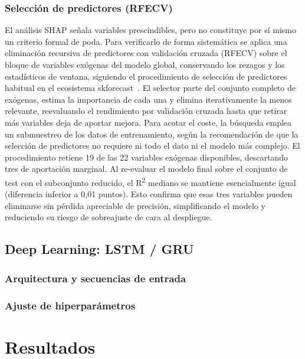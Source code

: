 \documentclass[12pt, a4paper]{article}
\begin{document}
\subsubsection{Selección de predictores (RFECV)}


El análisis SHAP señala variables prescindibles, pero no constituye por sí mismo un criterio formal de poda. Para verificarlo de forma sistemática se aplica una eliminación recursiva de predictores con validación cruzada (RFECV) sobre el bloque de variables exógenas del modelo global, conservando los rezagos y los estadísticos de ventana, siguiendo el procedimiento de selección de predictores habitual en el ecosistema skforecast~\cite{skforecast}. El selector parte del conjunto completo de exógenas, estima la importancia de cada una y elimina iterativamente la menos relevante, reevaluando el rendimiento por validación cruzada hasta que retirar más variables deja de aportar mejora. Para acotar el coste, la búsqueda emplea un submuestreo de los datos de entrenamiento, según la recomendación de que la selección de predictores no requiere ni todo el dato ni el modelo más complejo. El procedimiento retiene 19 de las 22 variables exógenas disponibles, descartando tres de aportación marginal. Al re-evaluar el modelo final sobre el conjunto de test con el subconjunto reducido, el R\textsuperscript{2} mediano se mantiene esencialmente igual (diferencia inferior a 0,01 puntos). Esto confirma que esas tres variables pueden eliminarse sin pérdida apreciable de precisión, simplificando el modelo y reduciendo su riesgo de sobreajuste de cara al despliegue.

\subsection{Deep Learning: LSTM / GRU}


\subsubsection{Arquitectura y secuencias de entrada}


\subsubsection{Ajuste de hiperparámetros}


\section{Resultados}
\end{document}
